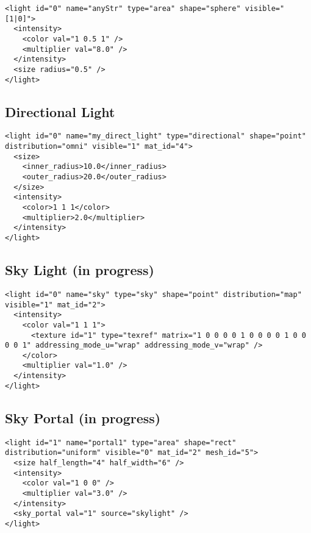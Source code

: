 \documentclass[a4paper,11pt]{report}
\begin{document}
\lstset{language=XML}
\begin{lstlisting}
<light id="0" name="anyStr" type="area" shape="sphere" visible="[1|0]">
  <intensity>
    <color val="1 0.5 1" />
    <multiplier val="8.0" />
  </intensity>
  <size radius="0.5" />
</light>
\end{lstlisting}

\subsection{Directional Light}
\lstset{language=XML}
\begin{lstlisting}
<light id="0" name="my_direct_light" type="directional" shape="point" distribution="omni" visible="1" mat_id="4">
  <size>
    <inner_radius>10.0</inner_radius>
    <outer_radius>20.0</outer_radius>
  </size>
  <intensity>
    <color>1 1 1</color>
    <multiplier>2.0</multiplier>
  </intensity>
</light>
\end{lstlisting}

\subsection{Sky Light (in progress)}
\lstset{language=XML}
\begin{lstlisting}
<light id="0" name="sky" type="sky" shape="point" distribution="map" visible="1" mat_id="2">
  <intensity>
    <color val="1 1 1">
      <texture id="1" type="texref" matrix="1 0 0 0 0 1 0 0 0 0 1 0 0 0 0 1" addressing_mode_u="wrap" addressing_mode_v="wrap" />
    </color>
    <multiplier val="1.0" />
  </intensity>
</light>
\end{lstlisting}


\subsection{Sky Portal (in progress)}
\lstset{language=XML}
\begin{lstlisting}
<light id="1" name="portal1" type="area" shape="rect" distribution="uniform" visible="0" mat_id="2" mesh_id="5">
  <size half_length="4" half_width="6" />
  <intensity>
    <color val="1 0 0" />
    <multiplier val="3.0" />
  </intensity>
  <sky_portal val="1" source="skylight" />
</light>
\end{lstlisting}
\end{document}
